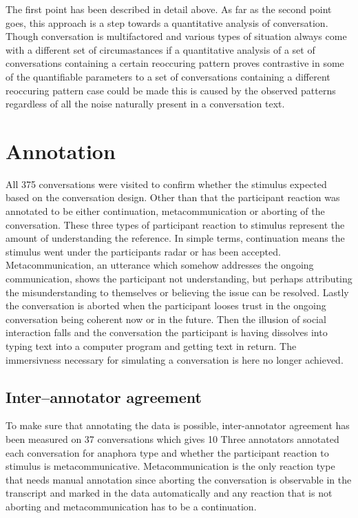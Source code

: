 The first point has been described in detail above.
As far as the second point goes,
this approach is a step towards
a quantitative analysis of conversation.
Though conversation is multifactored
and various types of situation
always come with a different set of circumastances
if a quantitative analysis of a set of conversations
containing a certain reoccuring pattern
proves contrastive in some of the quantifiable parameters
to a set of conversations containing a different reoccuring pattern
case could be made this is caused by the observed patterns
regardless of all the noise naturally present in a conversation text.

\section{Annotation}

All 375 conversations were visited to confirm whether
the stimulus expected based on the conversation design.
Other than that the participant reaction was annotated to be either
continuation, metacommunication or aborting of the conversation.
These three types of participant reaction to stimulus
represent the amount of understanding the reference.
In simple terms, continuation means
the stimulus went under the participants radar
or has been accepted.
Metacommunication, an utterance which somehow addresses the ongoing communication,
shows the participant not understanding,
but perhaps attributing the misunderstanding to themselves or
believing the issue can be resolved.
Lastly the conversation is aborted when the participant looses trust
in the ongoing conversation being coherent now or in the future.
Then the illusion of social interaction falls
and the conversation the participant is having dissolves into
typing text into a computer program and getting text in return.
The immersivness necessary for simulating a conversation is here no longer achieved.

\subsection{Inter--annotator agreement}

To make sure that annotating the data is possible,
inter-annotator agreement has been measured on 37 conversations which gives 10%
Three annotators annotated each conversation for anaphora type and
whether the participant reaction to stimulus is metacommunicative.
Metacommunication is the only reaction type that needs manual annotation since
aborting the conversation is
observable in the transcript and marked in the data automatically
and any reaction that is not aborting and metacommunication has to be a continuation.


